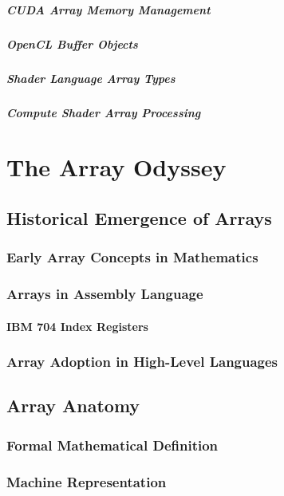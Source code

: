 \documentclass[12pt, oneside]{book}
\begin{document}
\subsubsection{CUDA Array Memory Management}
\subsubsection{OpenCL Buffer Objects}
\subsubsection{Shader Language Array Types}
\subsubsection{Compute Shader Array Processing}
	
	\part{The Array Odyssey}
	 \chapter{Historical Emergence of Arrays}
	 \section{Early Array Concepts in Mathematics}
	 \section{Arrays in Assembly Language}
	 \subsection{IBM 704 Index Registers}
	 \section{Array Adoption in High-Level Languages}
	 
	 \chapter{Array Anatomy}
	 \section{Formal Mathematical Definition}
	 \section{Machine Representation}
\end{document}
